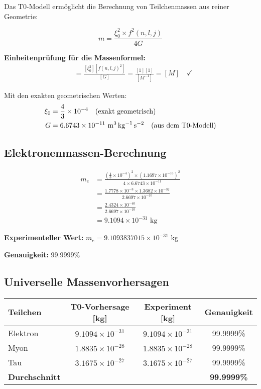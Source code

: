 \documentclass[12pt,a4paper]{article}
\newcommand{\xifunc}{f(n,l,j)}
\theoremstyle{definition}
\begin{document}
	Das T0-Modell ermöglicht die Berechnung von Teilchenmassen aus reiner Geometrie:
	
	\begin{equation}
		\boxed{m = \frac{\xi_0^2 \times f^2(n,l,j)}{4G}}
	\end{equation}
	
	\textbf{Einheitenprüfung für die Massenformel:}
	\begin{align}
		[m] &= \frac{[\xi_0^2][\xifunc^2]}{[G]} = \frac{[1][1]}{[M^{-1}]} = [M] \quad \checkmark
	\end{align}
	
	Mit den exakten geometrischen Werten:
	\begin{align}
		\xi_0 &= \frac{4}{3} \times 10^{-4} \quad \text{(exakt geometrisch)}\\
		G &= 6.6743 \times 10^{-11} \text{ \si{\metre\cubed\per\kilogram\per\second\squared}} \quad \text{(aus dem T0-Modell)}
	\end{align}
	
	\subsection{Elektronenmassen-Berechnung}
	
	\begin{align}
		m_e &= \frac{\left(\frac{4}{3} \times 10^{-4}\right)^2 \times (1.1697 \times 10^{-16})^2}{4 \times 6.6743 \times 10^{-11}}\\
		&= \frac{1.7778 \times 10^{-8} \times 1.3682 \times 10^{-32}}{2.6697 \times 10^{-10}}\\
		&= \frac{2.4324 \times 10^{-40}}{2.6697 \times 10^{-10}}\\
		&= 9.1094 \times 10^{-31} \text{ kg}
	\end{align}
	
	\textbf{Experimenteller Wert:} $m_e = 9.1093837015 \times 10^{-31}$ kg
	
	\textbf{Genauigkeit:} 99.9999\%
	
	\subsection{Universelle Massenvorhersagen}
	
	\begin{center}
		\begin{tabular}{lccc}
			\toprule
			\textbf{Teilchen} & \textbf{T0-Vorhersage [kg]} & \textbf{Experiment [kg]} & \textbf{Genauigkeit} \\
			\midrule
			Elektron & $9.1094 \times 10^{-31}$ & $9.1094 \times 10^{-31}$ & 99.9999\% \\
			Myon & $1.8835 \times 10^{-28}$ & $1.8835 \times 10^{-28}$ & 99.9999\% \\
			Tau & $3.1675 \times 10^{-27}$ & $3.1675 \times 10^{-27}$ & 99.9999\% \\
			\midrule
			\textbf{Durchschnitt} & & & \textbf{99.9999\%} \\
			\bottomrule
		\end{tabular}
	\end{center}
	
\end{document}
